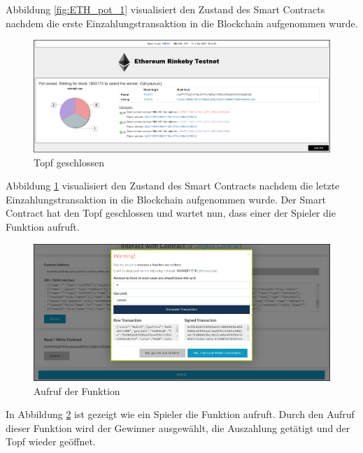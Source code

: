 \noindent Abbildung \ref{fig:ETH_pot_1} visualisiert den Zustand des Smart Contracts nachdem die erste Einzahlungstransaktion in die Blockchain aufgenommen wurde.

\begin{figure}[H]
\centering
\includegraphics[width=1\linewidth]{Figures/eth_gui/ETH_pot_closed}
\decoRule
\caption{Topf geschlossen}
\label{fig:ETH_pot_closed}
\end{figure}

\noindent Abbildung \ref{fig:ETH_pot_closed} visualisiert den Zustand des Smart Contracts nachdem die letzte Einzahlungstransaktion in die Blockchain aufgenommen wurde. Der Smart Contract hat den Topf geschlossen und wartet nun, dass einer der Spieler die  Funktion aufruft.

\begin{figure}[H]
\centering
\includegraphics[width=1\linewidth]{Figures/eth_gui/ETH_wallet_payout}
\decoRule
\caption{Aufruf der  Funktion}
\label{fig:ETH_wallet_payout}
\end{figure}

\noindent In Abbildung \ref{fig:ETH_wallet_payout} ist gezeigt wie ein Spieler die   Funktion aufruft. Durch den Aufruf dieser Funktion wird der Gewinner ausgewählt, die Auszahlung getätigt und der Topf wieder geöffnet.

